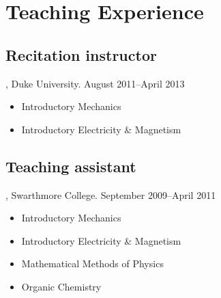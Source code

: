 \documentclass[letterpaper,10pt]{article}
\begin{document}
\pagebreak



\section{Teaching Experience}

\subsection{Recitation instructor}, Duke University. \hfill August 2011--April 2013

\begin{itemize}
  \item Introductory Mechanics
  \item Introductory Electricity \& Magnetism
\end{itemize}


\subsection{Teaching assistant}, Swarthmore College. \hfill September 2009--April 2011

\begin{itemize}
  \item Introductory Mechanics
  \item Introductory Electricity \& Magnetism
  \item Mathematical Methods of Physics
  \item Organic Chemistry
\end{itemize}
\end{document}
